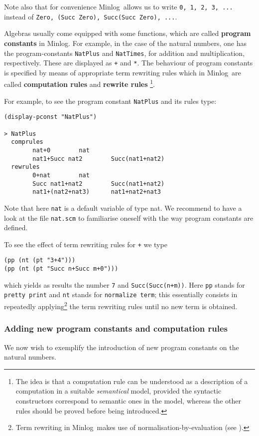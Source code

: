 \documentclass[12pt]{amsart}
\newcommand{\mi}{Minlog}
\begin{document}
Note also that for convenience \mi\ allows us to write \texttt{0, 1, 2,
  3, ...} instead of \texttt{Zero, (Succ Zero), Succ(Succ Zero), ...}.

Algebras usually come equipped with some functions, which are called
\textbf{program constants} in \mi. For example, in the case of the
natural numbers, one has the program-constants \texttt{NatPlus} and
\texttt{NatTimes}, for addition and multiplication, respectively.
These are displayed as \texttt{+} and \texttt{*}.  The behaviour of
program constants is specified by means of appropriate term rewriting
rules which in \mi\ are called \textbf{computation rules} and
\textbf{rewrite rules} \footnote{The idea is that a computation rule
  can be understood as a description of a computation in a suitable
  \emph{semantical} model, provided the syntactic constructors
  correspond to semantic ones in the model, whereas the other rules
  should be proved before being introduced.}.

For example, to see the program constant \texttt{NatPlus} and its rules
type:
\begin{verbatim}
(display-pconst "NatPlus")

> NatPlus
  comprules
        nat+0        nat
        nat1+Succ nat2        Succ(nat1+nat2)
  rewrules
        0+nat        nat
        Succ nat1+nat2        Succ(nat1+nat2)
        nat1+(nat2+nat3)      nat1+nat2+nat3
\end{verbatim}

Note that here \texttt{nat} is a default variable of type nat.  We
recommend to have a look at the file \texttt{nat.scm} to familiarise
oneself with the way program constants are defined.

To see the effect of term rewriting rules for \texttt{+} we type
\begin{verbatim}
(pp (nt (pt "3+4")))
(pp (nt (pt "Succ n+Succ m+0")))
\end{verbatim}
which yields as results the number \texttt{7} and
\texttt{Succ(Succ(n+m))}.  Here \texttt{pp} stands for \texttt{pretty
  print} and \texttt{nt} stands for \texttt{normalize term}; this
essentially consists in repeatedly applying\footnote{Term rewriting in
  \mi\ makes use of normalisation-by-evaluation (see
  \cite{minlogman}).} the term rewriting rules until no new term is
obtained.


\subsubsection{Adding new program constants and computation rules}
We now wish to exemplify the introduction of new program constants on
the natural numbers.
\end{document}
